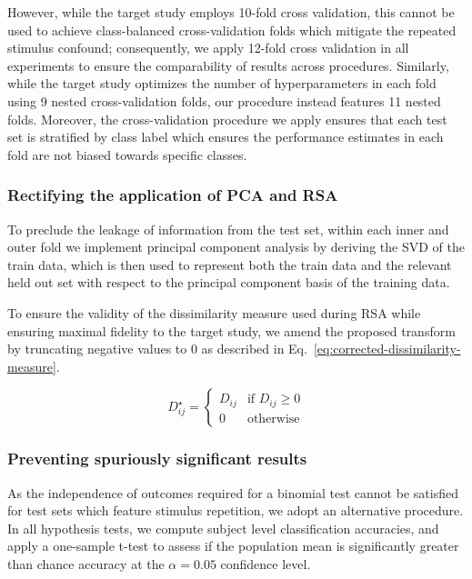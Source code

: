 However, while the target study employs 10-fold cross validation, this cannot be used to achieve class-balanced cross-validation folds which mitigate the repeated stimulus confound; consequently, we apply 12-fold cross validation in all experiments to ensure the comparability of results across procedures. Similarly, while the target study optimizes the number of hyperparameters in each fold using 9 nested cross-validation folds, our procedure instead features 11 nested folds. Moreover, the cross-validation procedure we apply ensures that each test set is stratified by class label which ensures the performance estimates in each fold are not biased towards specific classes. 

\subsubsection{Rectifying the application of PCA and RSA}
To preclude the leakage of information from the test set, within each inner and outer fold we implement principal component analysis by deriving the SVD of the train data, which is then used to represent both the train data and the relevant held out set with respect to the principal component basis of the training data.


To ensure the validity of the dissimilarity measure used during RSA while ensuring maximal fidelity to the target study, we amend the proposed transform by truncating negative values to 0 as described in Eq.~\ref{eq:corrected-dissimilarity-measure}.

\begin{equation} 
    D_{ij}^{\star} =
    \begin{cases}
        D_{ij} & \text{if \(D_{ij}\geq 0\)}\\
        0 & \text{otherwise}
    \end{cases}
    \label{eq:corrected-dissimilarity-measure}
\end{equation}

\subsubsection{Preventing spuriously significant results}
As the independence of outcomes required for a binomial test cannot be satisfied for test sets which feature stimulus repetition, we adopt an alternative procedure. In all hypothesis tests, we compute subject level classification accuracies, and apply a one-sample t-test to assess if the population mean is significantly greater than chance accuracy at the \(\alpha=0.05\) confidence level. 

